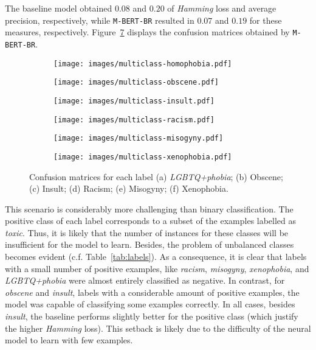 \documentclass[11pt,a4paper]{article}
\begin{document}
The baseline model obtained $0.08$ and $0.20$ of \textit{Hamming} loss and average precision, respectively, while \texttt{M-BERT-BR} resulted in $0.07$ and $0.19$ for these measures, respectively. Figure~\ref{fig:multilabelcm} displays the confusion matrices obtained by \texttt{M-BERT-BR}.

\begin{figure}[!ht]
\centering

\begin{subfigure}{.4\columnwidth}
  \centering
\texttt{[image: images/multiclass-homophobia.pdf]}
  \caption{}
  \label{fig:multiclass-homophobia}
\end{subfigure}
\begin{subfigure}{.4\columnwidth}
  \centering
\texttt{[image: images/multiclass-obscene.pdf]} 
  \caption{}
  \label{fig:multiclass-obscene}
\end{subfigure}
\begin{subfigure}{.4\columnwidth}
  \centering
\texttt{[image: images/multiclass-insult.pdf]}
  \caption{}
  \label{fig:multiclass-insult}
\end{subfigure}
\begin{subfigure}{.4\columnwidth}
\centering
\texttt{[image: images/multiclass-racism.pdf]}
  \caption{}
  \label{fig:multiclass-racism}
\end{subfigure}
\begin{subfigure}{.4\columnwidth}
  \centering
\texttt{[image: images/multiclass-misogyny.pdf]}
  \caption{}
  \label{fig:multiclass-misogyny}
\end{subfigure}
\begin{subfigure}{.4\columnwidth}
  \centering
\texttt{[image: images/multiclass-xenophobia.pdf]}
  \caption{}
  \label{fig:multiclass-xenophobia}
\end{subfigure}
\caption{Confusion matrices for each label (a) \textit{LGBTQ+phobia}; (b) Obscene; (c) Insult; (d) Racism; (e) Misogyny; (f) Xenophobia.}
\label{fig:multilabelcm}
\end{figure}

This scenario is considerably more challenging than binary classification. The positive class of each label corresponds to a subset of the examples labelled as \textit{toxic}. Thus, it is likely that the number of instances for these classes will be insufficient for the model to learn. Besides, the problem of unbalanced classes becomes evident (c.f. Table~\ref{tab:labels}). As a consequence, it is clear that labels with a small number of positive examples, like \textit{racism}, \textit{misogyny}, \textit{xenophobia}, and \textit{LGBTQ+phobia} were almost entirely classified as negative. In contrast, for \textit{obscene} and \textit{insult}, labels with a considerable amount of positive examples, the model was capable of classifying some examples correctly. In all cases, besides \textit{insult}, the baseline performs slightly better for the positive class (which justify the higher \textit{Hamming} loss). This setback is likely due to the difficulty of the neural model to learn with few examples.
\end{document}

